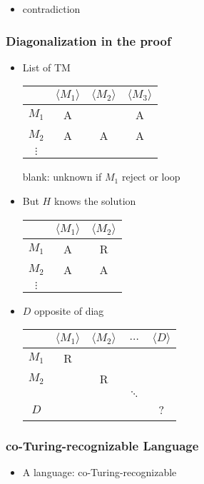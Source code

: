 \begin{frame}[allowframebreaks]
\begin{itemize}
\item contradiction

\end{itemize}\end{frame} \begin{frame}[allowframebreaks] \frametitle{Diagonalization in the proof}
  \begin{itemize}
\item List of TM
  \begin{center}
    \begin{tabular}{c|ccc}
& $\langle  M_1\rangle $ & $\langle  M_2\rangle $ & $\langle  M_3\rangle $\\ \hline
$M_1$ & A & &A\\
$M_2$ & A & A &A\\
$\vdots$ &&&
    \end{tabular}
  \end{center}
blank: unknown if $M_1$ reject or loop

\item But $H$ knows the solution
  \begin{center}
    \begin{tabular}{c|cc}
& $\langle  M_1\rangle $ & $\langle  M_2\rangle $ \\ \hline
$M_1$ & A & R\\
$M_2$ & A & A \\
$\vdots$ &&
    \end{tabular}
  \end{center}

\item $D$ opposite of diag
  \begin{center}
    \begin{tabular}{c|cccc}
& $\langle  M_1\rangle $ & $\langle  M_2\rangle $ & $\ldots$ & $\langle  D\rangle $\\ \hline
$M_1$ & R & &&\\
$M_2$ &  & R && \\
&& & $\ddots$ & \\
$D$ &&&& ?
    \end{tabular}
  \end{center}

\end{itemize}\end{frame} \begin{frame}[allowframebreaks] \frametitle{co-Turing-recognizable Language}
  \begin{itemize}
\item A language: co-Turing-recognizable


\end{itemize}
\end{frame}
